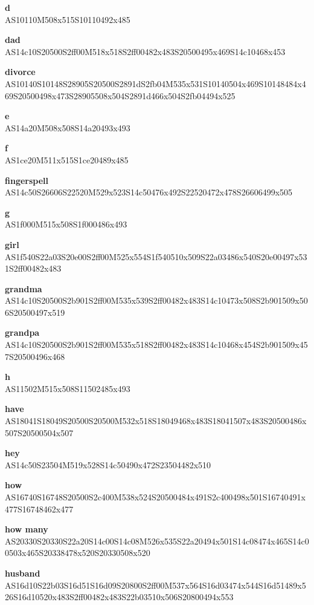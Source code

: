 \documentclass{article}
\begin{document}
\begin{glossary}
\textbf{d}\\
AS10110M508x515S10110492x485

\textbf{dad}\\
AS14c10S20500S2ff00M518x518S2ff00482x483S20500495x469S14c10468x453

\textbf{divorce}\\
AS10140S10148S28905S20500S2891dS2fb04M535x531S10140504x469S10148484x469S20500498x473S28905508x504S2891d466x504S2fb04494x525

\textbf{e}\\
AS14a20M508x508S14a20493x493

\textbf{f}\\
AS1ce20M511x515S1ce20489x485

\textbf{fingerspell}\\
AS14c50S26606S22520M529x523S14c50476x492S22520472x478S26606499x505

\textbf{g}\\
AS1f000M515x508S1f000486x493

\textbf{girl}\\
AS1f540S22a03S20e00S2ff00M525x554S1f540510x509S22a03486x540S20e00497x531S2ff00482x483

\textbf{grandma}\\
AS14c10S20500S2b901S2ff00M535x539S2ff00482x483S14c10473x508S2b901509x506S20500497x519

\textbf{grandpa}\\
AS14c10S20500S2b901S2ff00M535x518S2ff00482x483S14c10468x454S2b901509x457S20500496x468

\textbf{h}\\
AS11502M515x508S11502485x493

\textbf{have}\\
AS18041S18049S20500S20500M532x518S18049468x483S18041507x483S20500486x507S20500504x507

\textbf{hey}\\
AS14c50S23504M519x528S14c50490x472S23504482x510

\textbf{how}\\
AS16740S16748S20500S2c400M538x524S20500484x491S2c400498x501S16740491x477S16748462x477

\textbf{how many}\\
AS20330S20330S22a20S14c00S14c08M526x535S22a20494x501S14c08474x465S14c00503x465S20338478x520S20330508x520

\textbf{husband}\\
AS16d10S22b03S16d51S16d09S20800S2ff00M537x564S16d03474x544S16d51489x526S16d10520x483S2ff00482x483S22b03510x506S20800494x553


\end{glossary}
\end{document}
